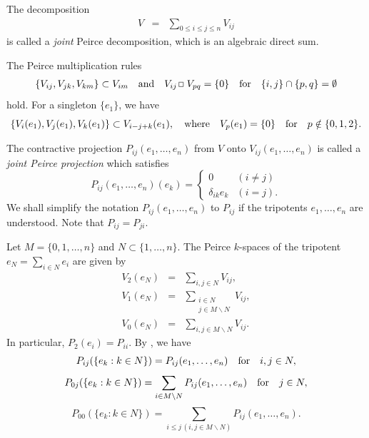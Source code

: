 \documentclass[12pt, twoside]{article}
\def\sqr#1#2{{\,\vcenter{\vbox{\hrule height.#2pt\hbox{\vrule width.#2pt
height#1pt \kern#1pt\vrule width.#2pt}\hrule height.#2pt}}\,}}
\def\bo{\sqr44\,}
\def\q{\quad}
\theoremstyle{definition}
\numberwithin{equation}{section}
\begin{document}
The decomposition
\begin{eqnarray*}
V & = & \sum_{0\leq i\leq j\leq n}V_{ij}
\end{eqnarray*}
is called a {\it joint} Peirce decomposition, which is an algebraic direct sum.

The Peirce multiplication rules
\begin{eqnarray}\label{bo}
\{V_{ij},V_{jk},V_{km}\}  \subset  V_{im}\q {\rm and} \q V_{ij} \bo V_{pq} =\{0\} \q {\rm for} \q
\{i,j\}\cap \{p,q\}=\emptyset
\end{eqnarray}
hold. For a singleton $\{e_1\}$, we have
$$\{V_i(e_1), V_j(e_1), V_k(e_1)\} \subset V_{i-j+k}(e_1), \quad {\rm where}\quad V_p(e_1)=\{0\} \quad
{\rm for}\quad p\notin \{0,1,2\}.$$


  The contractive projection $P_{ij}(e_{1},\dots,e_{n})$ from $V$ onto $V_{ij}(e_{1},\dots,e_{n})$
is called a {\it joint Peirce projection} which satisfies
\begin{equation}
 P_{ij}(e_{1},\dots,e_{n})(e_{k})= \left\{\begin{array}{ll} 0& (i \neq j)\\
                                                   \delta_{ik} e_k & (i=j).\label{pijek}
                                         \end{array}\right.
\end{equation}
We shall simplify the notation $P_{ij}(e_1,\ldots,e_n)$ to $P_{ij}$ if the tripotents $e_1, \ldots, e_n$
are understood. Note that $P_{ij}=P_{ji}$.

Let $M=\{0,1,\dots,n\}$ and $N\subset\{1,\dots,n\}$. The Peirce $k$-spaces of the tripotent $e_{N}=\sum_{i\in N}e_{i}$
 are given by
\begin{eqnarray}
V_{2}(e_{N}) & = & \sum_{i,j\in N}V_{ij},\label{Peirce-2 of sum}\\
V_{1}(e_{N}) & = & \sum_{\substack{i\in N\\
j\in M\backslash N
}
}V_{ij},\\
V_{0}(e_{N}) & = & \sum_{i,j\in M\backslash N}V_{ij}.\label{eq:Peirce-0 of sum}
\end{eqnarray}
In particular, $P_2(e_i) =P_{ii}$. By \cite[Lemma 2.1]{horo}, we have
\begin{equation}\label{lemma 2.1}
P_{ij}(\{e_k: k\in N\}) = P_{ij}(e_1, \ldots, e_n) \quad {\rm for} \quad i,j\in N,
\end{equation}
\begin{equation}\label{221}
P_{0j}(\{e_k: k\in N\}) = \sum_{i\in M \backslash N} P_{ij}(e_1, \ldots, e_n) \quad {\rm for} \quad j\in N,
\end{equation}
\begin{equation}\label{p00}
P_{00}(\{e_k: k\in N\}) = \sum_{i\leq j\,(i,j\in M \backslash N)} P_{ij}(e_1, \ldots, e_n).
\end{equation}
\end{document}
